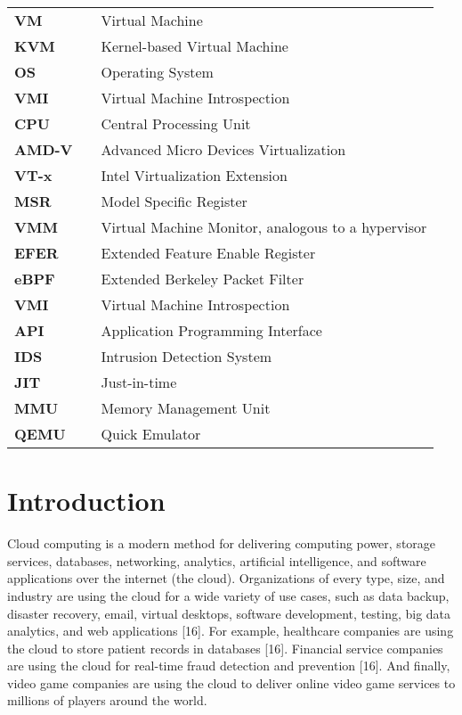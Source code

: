 \documentclass{report}
\begin{document}
\begin{spacing}{1.5}
\begin{tabular}{lcl}
\large{\bf VM}  & & \large{Virtual Machine} \\
\large{\bf KVM}  & & \large{Kernel-based Virtual Machine} \\
\large{\bf OS}   & & \large{Operating System}        \\
\large{\bf VMI}  & & \large{Virtual Machine Introspection} \\
\large{\bf CPU}  & & \large{Central Processing Unit} \\
\large{\bf AMD-V}  & & \large{Advanced Micro Devices Virtualization} \\
\large{\bf VT-x}  & & \large{Intel Virtualization Extension} \\
\large{\bf MSR}  & & \large{Model Specific Register} \\
\large{\bf VMM}  & & \large{Virtual Machine Monitor, analogous to a hypervisor} \\
\large{\bf EFER}  & & \large{Extended Feature Enable Register} \\
\large{\bf eBPF}  & & \large{Extended Berkeley Packet Filter} \\
\large{\bf VMI}  & & \large{Virtual Machine Introspection} \\
\large{\bf API}  & & \large{Application Programming Interface} \\
\large{\bf IDS}  & & \large{Intrusion Detection System} \\
\large{\bf JIT}  & & \large{Just-in-time} \\
\large{\bf MMU}  & & \large{Memory Management Unit} \\
\large{\bf QEMU}  & & \large{Quick Emulator} \\
\end{tabular}
















\newpage
\chapter{Introduction}


{\large
Cloud computing is a modern method for delivering computing power, storage services, databases, networking, analytics, artificial intelligence, and software applications over the internet (the cloud). Organizations of every type, size, and industry are using the cloud for a wide variety of use cases, such as data backup, disaster recovery, email, virtual desktops, software development, testing, big data analytics, and web applications [16]. For example, healthcare companies are using the cloud to store patient records in databases [16]. Financial service companies are using the cloud for real-time fraud detection and prevention [16]. And finally, video game companies are using the cloud to deliver online video game services to millions of players around the world.
\newline
}


\end{spacing}
\end{document}
